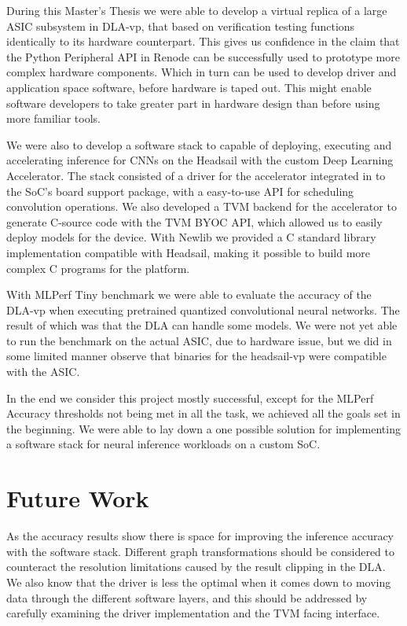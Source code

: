 \documentclass[12pt,a4paper,english
]{tunithesis}
\begin{document}
During this Master's Thesis we were able to develop a virtual replica of a large ASIC subsystem in DLA-vp, that based on verification testing functions identically to its hardware counterpart. This gives us confidence in the claim that the Python Peripheral API in Renode can be successfully used to prototype more complex hardware components. Which in turn can be used to develop driver and application space software, before hardware is taped out.
This might enable software developers to take greater part in hardware design than before using more familiar tools.

We were also to develop a software stack to capable of deploying, executing and accelerating inference for CNNs on the Headsail with the custom Deep Learning Accelerator.
The stack consisted of a driver for the accelerator integrated in to the SoC's board support package, with a easy-to-use API for scheduling convolution operations.
We also developed a TVM backend for the accelerator to generate C-source code with the TVM BYOC API, which allowed us to easily deploy models for the device.
With Newlib we provided a C standard library implementation compatible with Headsail, making it possible to build more complex C programs for the platform.

With MLPerf Tiny benchmark we were able to evaluate the accuracy of the DLA-vp when executing pretrained quantized convolutional neural networks. The result of which was that the DLA can handle some models. We were not yet able to run the benchmark on the actual ASIC, due to hardware issue, but we did in some limited manner observe that binaries for the headsail-vp were compatible with the ASIC.

In the end we consider this project mostly successful, except for the MLPerf Accuracy thresholds not being met in all the task, we achieved all the goals set in the beginning. We were able to lay down a one possible solution for implementing a software stack for neural inference workloads on a custom SoC.

\section{Future Work}
As the accuracy results show there is space for improving the inference accuracy with the software stack. Different graph transformations should be considered to counteract the resolution limitations caused by the result clipping in the DLA. We also know that the driver is less the optimal when it comes down to moving data through the different software layers, and this should be addressed by carefully examining the driver implementation and the TVM facing interface.
\end{document}
